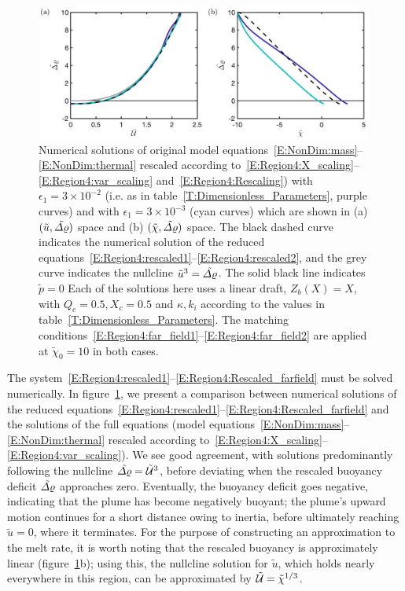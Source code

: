 \documentclass[openacc]{rsproca_new}%
\newcommand{\epsone}{\epsilon_{1}} %
\begin{document}
\begin{figure}
\centering
\includegraphics[width = 0.99\textwidth]{Submitted_PRSA/make_plots/plots/figure5.png}
\caption{Numerical solutions of original model equations~\eqref{E:NonDim:mass}--\eqref{E:NonDim:thermal} rescaled according to~\eqref{E:Region4:X_scaling}--\eqref{E:Region4:var_scaling} and~\eqref{E:Region4:Rescaling}) with $\epsone = 3\times 10^{-2}$ (i.e. as in table~\ref{T:Dimensionless_Parameters}, purple curves) and with $\epsone = 3\times 10^{-3}$ (cyan curves) which are shown in (a) $(\tilde{u}, \tilde{\varDelta \varrho})$ space and (b) $(\tilde{\chi}, \tilde{\varDelta \varrho})$ space. The black dashed curve indicates the numerical solution of the reduced equations~\eqref{E:Region4:rescaled1}--\eqref{E:Region4:rescaled2}, and the grey curve indicates the nullcline $\tilde{u}^3 = \tilde{\varDelta \varrho}$. The solid black line indicates $\tilde{p} = 0$ Each of the solutions here uses a linear draft, $Z_b(X) = X$, with $Q_c = 0.5, X_c = 0.5$ and $\kappa, k_i$ according to the values in table~\ref{T:Dimensionless_Parameters}. The matching conditions~\eqref{E:Region4:far_field1}--\eqref{E:Region4:far_field2} are applied at $\tilde{\chi}_0 = 10$ in both cases. }\label{fig:Region4}
\end{figure}

The system~\eqref{E:Region4:rescaled1}--\eqref{E:Region4:Rescaled_farfield} must be solved numerically. In figure~\ref{fig:Region4}, we present a comparison between numerical solutions of the reduced equations~\eqref{E:Region4:rescaled1}--\eqref{E:Region4:Rescaled_farfield} and the solutions of the full equations (model equations~\eqref{E:NonDim:mass}--\eqref{E:NonDim:thermal} rescaled according to~\eqref{E:Region4:X_scaling}--\eqref{E:Region4:var_scaling}). We see good agreement, with solutions predominantly following the nullcline $\tilde{\varDelta \varrho} = \tilde{\mathcal{U}}^3$, before deviating when the rescaled buoyancy deficit $\tilde{\varDelta \varrho}$ approaches zero. Eventually, the buoyancy deficit goes negative, indicating that the plume has become negatively buoyant; the plume's upward motion continues for a short distance owing to inertia, before ultimately reaching $\tilde{u} = 0$, where it terminates. For the purpose of constructing an approximation to the melt rate, it is worth noting that the rescaled buoyancy is approximately linear (figure~\ref{fig:Region4}b); using this, the nullcline solution for $\tilde{u}$, which holds nearly everywhere in this region, can be approximated by $\tilde{\mathcal{U}} = \tilde{\chi}^{1/3}$.
\end{document}
